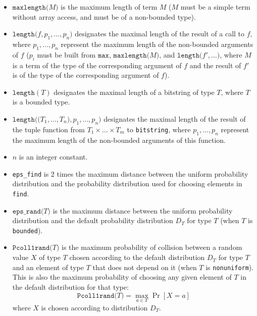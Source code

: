 \begin{itemize}
\item $\texttt{maxlength(}M\texttt{)}$ is the maximum
length of term $M$ ($M$ must be a simple term without array access, 
and must be of a non-bounded type).

\item $\texttt{length(}f, p_1, \ldots, p_n\texttt{)}$ designates the maximal
length of the result of a call to $f$, where $p_1, \ldots, p_n$
represent the maximum length of the non-bounded arguments of $f$
($p_i$ must be built from $\texttt{max}$,
$\texttt{maxlength(}M\texttt{)}$, and $\texttt{length(}f', \ldots
\texttt{)}$, where $M$ is a term of the type of the corresponding
argument of $f$ and the result of $f'$ is of the type of the
corresponding argument of $f$).

\item $\texttt{length}(T)$ designates the maximal 
length of a bitstring of type $T$, where $T$ is a bounded type.

\item $\texttt{length((}T_1, \ldots, T_n\texttt{)}, p_1, \ldots,
p_n\texttt{)}$ designates the maximal length of the result of the
tuple function from $T_1 \times \ldots \times T_m$ to
\texttt{bitstring}, where $p_1, \ldots, p_n$ represent the maximum
length of the non-bounded arguments of this function.

\item $n$ is an integer constant.

\item \texttt{eps\_find} is 2 times the maximum distance between the uniform probability
distribution and the probability distribution used for choosing elements
in {\tt find}.

\item $\texttt{eps\_rand(}T\texttt{)}$ is the maximum distance between the 
uniform probability distribution and the default probability distribution 
$D_T$ for type $T$ (when $T$ is \texttt{bounded}).

\item 
$\texttt{Pcoll1rand(}T\texttt{)}$ is the maximum probability of
collision between a random value $X$ of type $T$ chosen according
to the default distribution $D_T$ for type $T$ and an element of type $T$
that does not depend on it (when $T$ is \texttt{nonuniform}).
This is also the maximum probability of choosing any given element of 
$T$ in the default distribution for that type:
\[\texttt{Pcoll1rand(}T\texttt{)} = \max_{a \in T} \Pr[X = a]\]
where $X$ is chosen according to distribution $D_T$.


\end{itemize}
